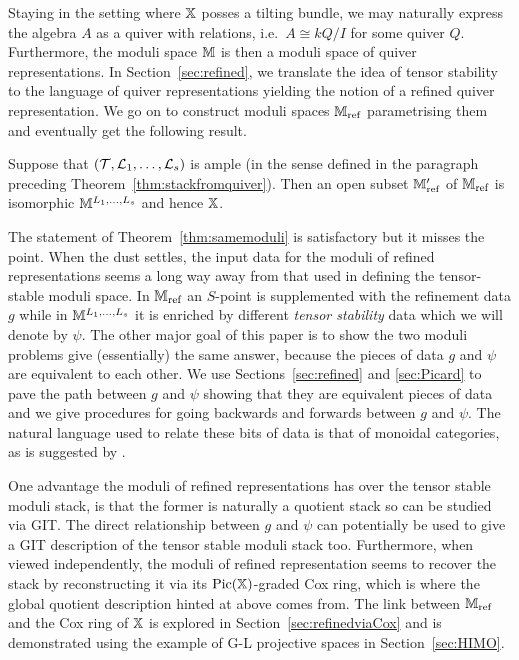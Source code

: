 \documentclass[12pt]{amsart}
\begin{document}
Staying in the setting where $\mathbb{X}$ posses a tilting bundle, we may naturally express the algebra $A$ as a quiver with relations, i.e.\ $A \cong kQ/I$ for some quiver $Q$.
Furthermore, the moduli space $\mathbb{M}$ is then a moduli space of quiver representations.
In Section~\ref{sec:refined}, we translate the idea of tensor stability to the language of quiver representations yielding the notion of a refined quiver representation.
We go on to construct moduli spaces $\mathbb{M}_\text{ref}$ parametrising them and eventually get the following result.
\begin{theorem}  \label{thm:samemoduli}
Suppose that $(\mathcal{T},\mathcal{L}_1,\ldots,\mathcal{L}_s)$ is ample (in the sense defined in the paragraph preceding Theorem~\ref{thm:stackfromquiver}). Then an open subset $\mathbb{M}_{\textup{ref}}'$ of $\mathbb{M}_{\textup{ref}}$ is isomorphic $\mathbb{M}^{L_1,\ldots,L_s}$ and hence $\mathbb{X}$.
\end{theorem}

The statement of Theorem~\ref{thm:samemoduli} is satisfactory but it misses the point.
When the dust settles, the input data for the moduli of refined representations seems a long way away from that used in defining the tensor-stable moduli space.
In $\mathbb{M}_\text{ref}$ an $S$-point is supplemented with the refinement data $g$ while in $\mathbb{M}^{L_1,\ldots,L_s}$ it is enriched by different {\em tensor stability} data which we will denote by $\psi$.
The other major goal of this paper is to show the two moduli problems give (essentially) the same answer, because the pieces of data $g$ and $\psi$ are equivalent to each other.
We use Sections~\ref{sec:refined} and \ref{sec:Picard} to pave the path between $g$ and $\psi$ showing that they are equivalent pieces of data and we give procedures for going backwards and forwards between $g$ and $\psi$.
The natural language used to relate these bits of data is that of monoidal categories, as is suggested by \cite{Lurie}. 

One advantage the moduli of refined representations has over the tensor stable moduli stack, is that the former is naturally a quotient stack so can be studied via GIT. 
The direct relationship between $g$ and $\psi$ can potentially be used to give a GIT description of the tensor stable moduli stack too.
Furthermore, when viewed independently, the moduli of refined representation seems to recover the stack by reconstructing it via its $\operatorname{Pic}(\mathbb{X})$-graded Cox ring, which is where the global quotient description hinted at above comes from.
The link between $\mathbb{M}_\text{ref}$ and the Cox ring of $\mathbb{X}$ is explored in Section~\ref{sec:refinedviaCox} and is demonstrated using the example of G-L projective spaces in Section~\ref{sec:HIMO}.
\end{document}
